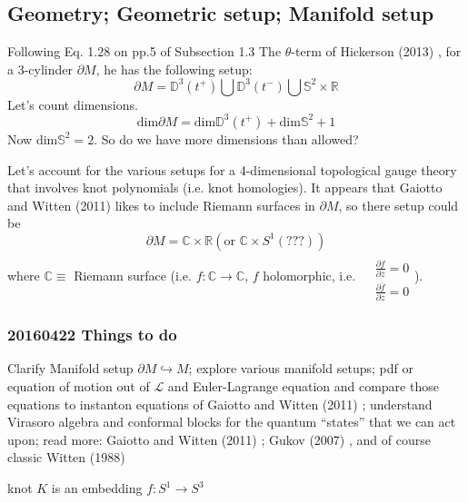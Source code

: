 \documentclass[10pt]{amsart}
\begin{document}
\subsection{Geometry; Geometric setup; Manifold setup}

Following Eq. 1.28 on pp.5 of Subsection 1.3 The $\theta$-term of Hickerson (2013) \cite{Hick2013}, for a 3-cylinder $\partial M$, he has the following setup:
\[
\partial M = \mathbb{D}^3(t^+) \bigcup \mathbb{D}^3(t^-) \bigcup \mathbb{S}^2 \times \mathbb{R}
\]
Let's count dimensions.  
\[
\text{dim} \partial M  = \text{dim} \mathbb{D}^3(t^+) + \text{dim}\mathbb{S}^2 + 1 
\]
Now $\text{dim}\mathbb{S}^2 =2$.  So do we have more dimensions than allowed?  

Let's account for the various setups for a 4-dimensional topological gauge theory that involves knot polynomials (i.e. knot homologies).  It appears that Gaiotto and Witten (2011) \cite{GW2011} likes to include Riemann surfaces in $\partial M$, so there setup could be
\[
\partial M = \mathbb{C} \times \mathbb{R} (\text{or } \mathbb{C}\times S^1 (???) )
\]
where $\mathbb{C} \equiv $ Riemann surface (i.e. $f:\mathbb{C} \to \mathbb{C}$, $f$ holomorphic, i.e. $\begin{aligned} & \quad \\
  & \frac{ \partial f}{ \partial \overline{z}} = 0 \\
  & \frac{ \partial \overline{f}}{ \partial z } = 0 \end{aligned}$).  

\subsubsection{20160422 Things to do}

Clarify Manifold setup $\partial M \hookrightarrow M$; explore various manifold setups; pdf or equation of motion out of $\mathcal{L}$ and Euler-Lagrange equation and compare those equations to instanton equations of Gaiotto and Witten (2011) \cite{GW2011}; understand Virasoro algebra and conformal blocks for the quantum ``states'' that we can act upon; read more: Gaiotto and Witten (2011) \cite{GW2011}; Gukov (2007) \cite{Guko2007}, and of course classic Witten (1988) \cite{Witten:1988hf}


knot $K$ is an embedding $f: S^1 \to S^3$

\end{document}
